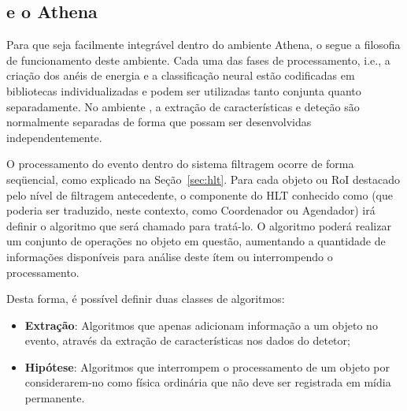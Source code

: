 \subsection{ e o Athena}

Para que seja facilmente integrável dentro do ambiente Athena, o
 segue a filosofia de funcionamento deste ambiente. Cada uma
das fases de processamento, i.e., a criação dos anéis de energia e a
classificação neural estão codificadas em bibliotecas individualizadas e podem
ser utilizadas tanto conjunta quanto separadamente. No ambiente
, a extração de características e deteção são normalmente
separadas de forma que possam ser desenvolvidas independentemente.

O processamento do evento dentro do sistema filtragem ocorre de forma
seqüencial, como explicado na Seção~\ref{sec:hlt}. Para cada objeto ou RoI
destacado pelo nível de filtragem antecedente, o componente do HLT conhecido
como  (que poderia ser traduzido, neste contexto, como
Coordenador ou Agendador) irá definir o algoritmo que será chamado para
tratá-lo. O algoritmo poderá realizar um conjunto de operações no objeto em
questão, aumentando a quantidade de informações disponíveis para análise deste
ítem ou interrompendo o processamento.

Desta forma, é possível definir duas classes de algoritmos:

\begin{itemize}
\item \textbf{Extração}: Algoritmos que apenas adicionam informação a um
objeto no evento, através da extração de características nos dados do detetor;
\item \textbf{Hipótese}: Algoritmos que interrompem o processamento de um
objeto por considerarem-no como física ordinária que não deve ser registrada
em mídia permanente.
\end{itemize}


